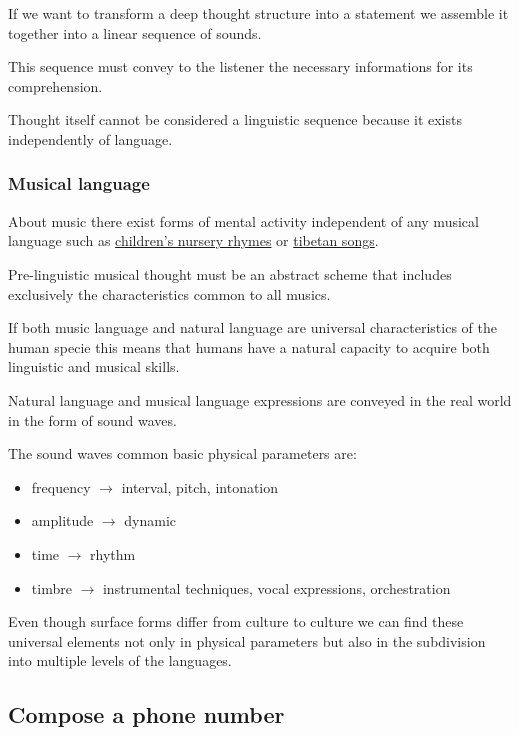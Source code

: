 If we want to transform a deep thought structure into a statement we assemble it together into a linear sequence of sounds.

This sequence must convey to the listener the necessary informations for its comprehension.

Thought itself cannot be considered a linguistic sequence because it exists independently of language.

\subsubsection{Musical language}\label{musical-language}

About music there exist forms of mental activity independent of any musical language such as \href{bimbi.mp3}{children's nursery rhymes} or \href{tibet.mp3}{tibetan songs}.

Pre-linguistic musical thought must be an abstract scheme that includes exclusively the characteristics common to all musics.

If both music language and natural language are universal characteristics of the human specie this means that humans have a natural capacity to acquire both linguistic and musical skills.

Natural language and musical language expressions are conveyed in the real world in the form of sound waves.

The sound waves common basic physical parameters are: 

\begin{itemize}
\tightlist
\item frequency \(\rightarrow\) interval, pitch, intonation 
\item amplitude \(\rightarrow\) dynamic 
\item time \(\rightarrow\) rhythm 
\item timbre \(\rightarrow\) instrumental techniques, vocal expressions, orchestration
\end{itemize}

Even though surface forms differ from culture to culture we can find these universal elements not only in physical parameters but also in the subdivision into multiple levels of the languages.

\subsection{Compose a phone number}\label{compose-a-phone-number}


